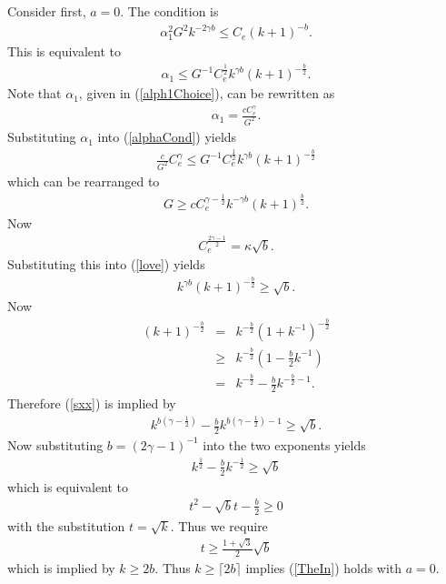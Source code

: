 Consider first, $a=0$. The condition is
\begin{eqnarray*}
\label{alphaCondFirst}
\alpha_1^2 G^2
k^{-2\gamma b}
\leq
C_e (k+1)^{-b}.
\end{eqnarray*}
This is equivalent to
\begin{eqnarray}\label{alphaCond}
\alpha_1 
\leq
G^{-1}C_e^{\frac{1}{2}} k^{\gamma b} (k+1)^{-\frac{b}{2}}.
\end{eqnarray}
Note that $\alpha_1$, given in (\ref{alph1Choice}), can be rewritten as
\begin{eqnarray*}
\alpha_1 = \frac{c C_e^\gamma}{G^2}.
\end{eqnarray*}
 Substituting $\alpha_1$ into (\ref{alphaCond}) yields
\begin{eqnarray*}
\frac{c}{G^2}C_e^\gamma \leq 
G^{-1}C_e^{\frac{1}{2}}k^{\gamma b} (k+1)^{-\frac{b}{2}}
\end{eqnarray*}
which can be rearranged to
\begin{eqnarray}
G\geq
c
C_e^{\gamma-\frac{1}{2}}k^{-\gamma b} (k+1)^{\frac{b}{2}}.\label{love}
\end{eqnarray}
Now 
\begin{eqnarray*}
C_e^{\frac{2\gamma-1}{2}} 
=
\kappa\sqrt{b}.
\end{eqnarray*}
Substituting this into (\ref{love}) yields
\begin{eqnarray}
k^{\gamma b} (k+1)^{-\frac{b}{2}}\geq 
\sqrt{b}.\label{sxx}
\end{eqnarray}
Now
\begin{eqnarray*}
(k+1)^{-\frac{b}{2}}
&=&
k^{-\frac{b}{2}}(1+k^{-1})^{-\frac{b}{2}}
\\
&\geq&
k^{-\frac{b}{2}}
\left(1
-\frac{b}{2}k^{-1}
\right)
\\
&=&
k^{-\frac{b}{2}}
-\frac{b}{2}k^{-\frac{b}{2}-1}.
\end{eqnarray*}
Therefore (\ref{sxx}) is implied by
\begin{eqnarray*}
k^{b(\gamma-\frac{1}{2})}
-
\frac{b}{2}
k^{b(\gamma-\frac{1}{2})-1}
\geq
\sqrt{b}.
\end{eqnarray*}
Now substituting $b=(2\gamma-1)^{-1}$ into the two exponents yields
\begin{eqnarray*}
k^{\frac{1}{2}}-\frac{b}{2}k^{-\frac{1}{2}}\geq\sqrt{b}
\end{eqnarray*}
which is equivalent to
\begin{eqnarray*}
t^2 - \sqrt{b} t - \frac{b}{2}\geq 0 
\end{eqnarray*}
with the substitution $t=\sqrt{k}$. Thus we require
\begin{eqnarray*}
t
\geq
\frac{1+\sqrt{3}}{2}\sqrt{b}
\end{eqnarray*}
which is implied by $k\geq 2 b$. Thus $k\geq \lceil2 b\rceil$ implies (\ref{TheIn}) holds with $a=0$.


